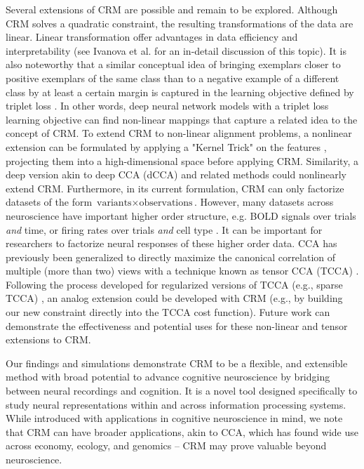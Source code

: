 \documentclass{article}
\begin{document}
Several extensions of CRM are possible and remain to be explored. Although CRM solves a quadratic constraint, the resulting transformations of the data are linear. Linear transformation offer advantages in data efficiency and interpretability (see Ivanova et al. \cite{ivanova_beyond_2022} for an in-detail discussion of this topic). It is also noteworthy that a similar conceptual idea of bringing exemplars closer to positive exemplars of the same class than to a negative example of a different class by at least a certain margin is captured in the learning objective defined by triplet loss \cite{schroffFaceNetUnifiedEmbedding2015}. In other words, deep neural network models with a triplet loss learning objective can find non-linear mappings that capture a related idea to the concept of CRM. To extend CRM to non-linear alignment problems, a nonlinear extension can be formulated by applying a "Kernel Trick" on the features \cite{akahoKernelMethodCanonical2007}, projecting them into a high-dimensional space before applying CRM. Similarity, a deep version akin to deep CCA (dCCA) and related methods \cite{Galen2013,koukuntlaUnsupervisedDiscoveryShared2024a} could nonlinearly extend CRM. Furthermore, in its current formulation, CRM can only factorize datasets of the form $\text{variants}\times\text{observations}$. However, many datasets across neuroscience have important higher order structure, e.g. BOLD signals over trials \textit{and} time, or firing rates over trials \textit{and} cell type \cite{schottdorfQuantitativeDescriptionMacaque2021}. It can be important for researchers to factorize neural responses of these higher order data. CCA has previously been generalized to directly maximize the canonical correlation of multiple (more than two) views with a technique known as tensor CCA (TCCA) \cite{luoTensorCanonicalCorrelation2015}. Following the process developed for regularized versions of TCCA (e.g., sparse TCCA) \cite{zhuRiemannianOptimizationSparse2025}, an analog extension could be developed with CRM (e.g., by building our new constraint directly into the TCCA cost function). Future work can demonstrate the effectiveness and potential uses for these non-linear and tensor extensions to CRM.

Our findings and simulations demonstrate CRM to be a flexible, and extensible method with broad potential to advance cognitive neuroscience by bridging between neural recordings and cognition. It is a novel tool designed specifically to study neural representations within and across information processing systems. While introduced with applications in cognitive neuroscience in mind, we note that CRM can have broader applications, akin to CCA, which has found wide use across economy, ecology, and genomics \cite{wittenExtensionsSparseCanonical2009,parkhomenkoSparseCanonicalCorrelation2009, mazuruseCanonicalCorrelationAnalysis2014,vinodCanonicalRidgeEconometrics1976} -- CRM may prove valuable beyond neuroscience.
\end{document}
